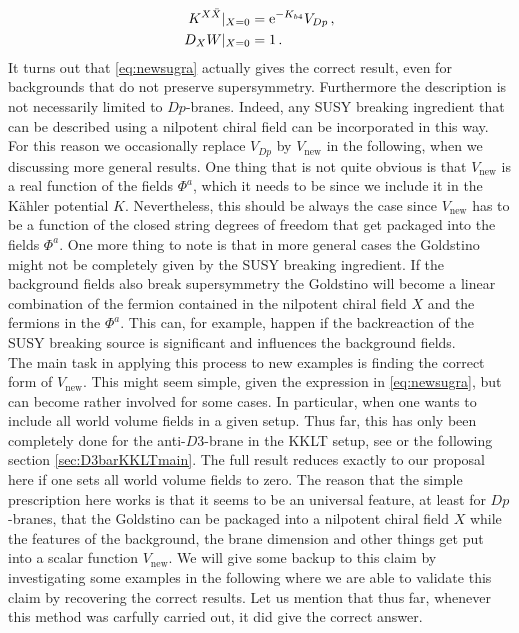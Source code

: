 \documentclass[a4paper,12pt]{report}
\newcommand{\bea}{\begin{equation}\begin{aligned}}
\newcommand{\eea}{\end{aligned}\end{equation}}
\def\rme{{\rm e}}
\begin{document}
\bea 
K^{X\bar{X}}|_{X=0} &= \rme^{-K_{b4}} V_{Dp}\,,\\
D_X W|_{X=0} &= 1\,.
\eea
It turns out that \eqref{eq:newsugra} actually gives the correct result, even for backgrounds that do not preserve supersymmetry. Furthermore the description is not necessarily limited to $Dp$-branes. Indeed, any SUSY breaking ingredient that can be described using a nilpotent chiral field can be incorporated in this way. For this reason we occasionally replace $V_{Dp}$ by $V_{\text{new}}$ in the following, when we discussing more general results. One thing that is not quite obvious is that $V_{\text{new}}$ is a real function of the fields $\Phi^a$, which it needs to be since we include it in the Kähler potential $K$. Nevertheless, this should be always the case since $V_{\text{new}}$ has to be a function of the closed string degrees of freedom that get packaged into the fields $\Phi^a$. One more thing to note is that in more general cases the Goldstino might not be completely given by the SUSY breaking ingredient. If the background fields also break supersymmetry the Goldstino will become a linear combination of the fermion contained in the nilpotent chiral field $X$ and the fermions in the $\Phi^a$. This can, for example, happen if the backreaction of the SUSY breaking source is significant and influences the background fields.\\
The main task in applying this process to new examples is finding the correct form of $V_{\text{new}}$. This might seem simple, given the expression in \eqref{eq:newsugra}, but can become rather involved for some cases. In particular, when one wants to include all world volume fields in a given setup. Thus far, this has only been completely done for the anti-$D3$-brane in the KKLT setup, see \cite{Cribiori:2019hod} or the following section \ref{sec:D3barKKLTmain}. The full result reduces exactly to our proposal here if one sets all world volume fields to zero. The reason that the simple prescription here works is that it seems to be an universal feature, at least for $Dp$-branes, that the Goldstino can be packaged into a nilpotent chiral field $X$ while the features of the background, the brane dimension and other things get put into a scalar function $V_{\text{new}}$. We will give some backup to this claim by investigating some examples in the following where we are able to validate this claim by recovering the correct results. Let us mention that thus far, whenever this method was carfully carried out, it did give the correct answer.
\end{document}
